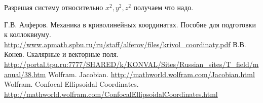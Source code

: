 \documentclass[12pt]{report}
\begin{document}
Разрешая систему относительно $x^2,y^2,z^2$ получаем что надо.

\begin{thebibliography}{0}
	Г.В. Алферов. Механика в криволинейных координатах. Пособие для подготовки к коллоквиуму.
	\url{http://www.apmath.spbu.ru/ru/staff/alferov/files/krivol_coordinaty.pdf}
	В.В. Конев. Скалярные и векторные поля.
	\url{http://portal.tpu.ru:7777/SHARED/k/KONVAL/Sites/Russian_sites/T_field/manual/38.htm}
	Wolfram. Jacobian.
	\url{http://mathworld.wolfram.com/Jacobian.html}
	Wolfram. Confocal Ellipsoidal Coordinates.
	\url{http://mathworld.wolfram.com/ConfocalEllipsoidalCoordinates.html}
\end{thebibliography}
\end{document}
